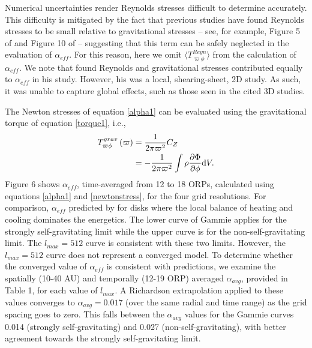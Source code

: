 \documentclass[manuscript]{aastex}
\begin{document}
  

Numerical uncertainties render Reynolds stresses difficult to determine accurately. 
This difficulty is mitigated by the fact that 
previous studies have found Reynolds stresses to be small relative to gravitational stresses -- see, 
for example, Figure 5 of \cite{lodato2004} and Figure 10 of \cite{boley2006} -- suggesting that this term
can be safely neglected in the evaluation of $\alpha_{eff}$.   For this reason, 
here we omit
$\langle T_{\varpi\phi}^{Reyn}\rangle$ from the calculation of $\alpha_{eff}$. 
We note that \cite{gammie2001}  found
Reynolds and gravitational stresses contributed equally to $\alpha_{eff}$ in his study.  However,
his was a local, shearing-sheet, 2D study.  As such, it was unable to capture global effects, such
as those seen in the cited 3D studies.  


The Newton stresses of equation \ref{alpha1} can be evaluated using the gravitational torque of equation \ref{torque1}, i.e.,
\begin{equation}
\label{newtonstress}
\begin{split}
 T_{\varpi\phi}^{grav}\left( \varpi \right) & = \frac{1}{2\pi\varpi^2}C_Z\\
                                & = - \frac{1}{2\pi\varpi^2} \int \rho\frac{\partial\Phi}{\partial\phi} {\rm d}V.
\end{split}
\end{equation}
Figure 6 shows $\alpha_{eff}$, time-averaged from 12 to 18 ORPs, calculated using equations \ref{alpha1} and \ref{newtonstress},
for the four grid resolutions.  For comparison, 
$\alpha_{eff}$ predicted by \citet{gammie2001} for disks where the local balance of heating and cooling dominates the energetics.  The lower curve of Gammie applies for the strongly self-gravitating limit while the upper curve 
is for the non-self-gravitating limit.   The $l_{max} = 512$ curve is consistent with these two limits.  However, 
the  $l_{max} = 512$ curve does not represent a converged model.
To determine whether the converged value of $\alpha_{eff}$ is consistent with predictions, we examine 
the spatially (10-40 AU) and temporally (12-19 ORP) averaged  $\alpha_{avg}$,
provided in Table 1, for each value of  $l_{max}$.    A Richardson extrapolation applied to these values  
converges to $\alpha_{avg} = 0.017$ (over the same radial  and time range)
as the grid spacing goes to zero.   This falls
between the $\alpha_{avg}$ values for the Gammie curves 0.014 (strongly self-gravitating) and 0.027 (non-self-gravitating),
with better agreement towards the strongly self-gravitating limit.
\end{document}
